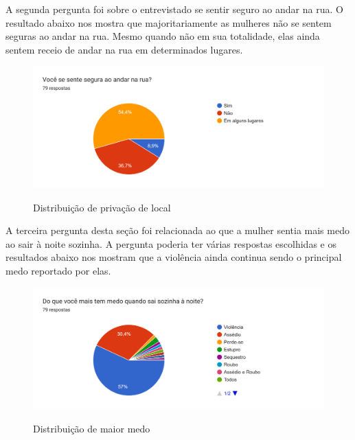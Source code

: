 A segunda pergunta foi sobre o entrevistado se sentir seguro ao andar na rua. O resultado abaixo nos mostra que majoritariamente as mulheres não se sentem seguras ao andar na rua. Mesmo quando não em sua totalidade, elas ainda sentem receio de andar na rua em determinados lugares. 
\begin{figure}[h]
  \begin{center}
  \includegraphics[width=1.0\linewidth]{images/distribuicao-seguranca-rua.png}\\
  \end{center}
  \caption[Distribuição de privação de local]{Distribuição de privação de local}
  \label{fig:mapa-empatia=inicial}
\end{figure}

A terceira pergunta desta seção foi relacionada ao que a mulher sentia mais medo ao sair à noite sozinha. A pergunta poderia ter várias respostas escolhidas e os resultados abaixo nos mostram que a violência ainda continua sendo o principal medo reportado por elas.
\begin{figure}[h]
  \begin{center}
  \includegraphics[width=1.0\linewidth]{images/distribuicao-medo.png}\\
  \end{center}
  \caption[Distribuição de maior medo]{Distribuição de maior medo}
  \label{fig:mapa-empatia=inicial}
\end{figure}

